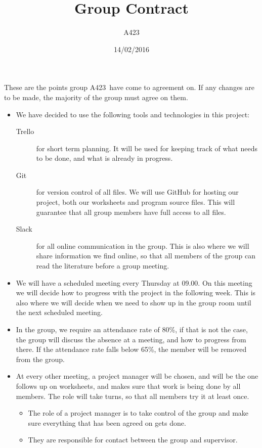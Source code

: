 \documentclass[a4paper,12pt,hidelinks]{article}
\newcommand{\group}{A423}
\begin{document}
	\title{Group Contract}
	\author{\group}
	\date{14/02/2016}
	\maketitle
	
	These are the points group \group \, have come to agreement on. If any changes are to be made, the majority of the group must agree on them.
	\begin{itemize}
		\item We have decided to use the following tools and technologies in this project:
		\begin{description}
			\item[Trello] for short term planning. It will be used for keeping track of what needs to be done, and what is already in progress.
			\item[Git] for version control of all files. We will use GitHub for hosting our project, both our worksheets and program source files. This will guarantee that all group members have full access to all files.
			\item[Slack] for all online communication in the group. This is also where we will share information we find online, so that all members of the group can read the literature before a group meeting. 
		\end{description}
		\item We will have a scheduled meeting every Thursday at 09.00. On this meeting we will decide how to progress with the project in the following week. This is also where we will decide when we need to show up in the group room until the next scheduled meeting.
		\item In the group, we require an attendance rate of 80\%, if that is not the case, the group will discuss the absence at a meeting, and how to progress from there. If the attendance rate falls below 65\%, the member will be removed from the group.
		\item At every other meeting, a project manager will be chosen, and will be the one follows up on worksheets, and makes sure that work is being done by all members. The role will take turns, so that all members try it at least once.
		\begin{itemize}
		\item The role of a project manager is to take control of the group and make sure everything that has been agreed on gets done.
		\item They are responsible for contact between the group and supervisor.

\end{itemize}
\end{itemize}
\end{document}
